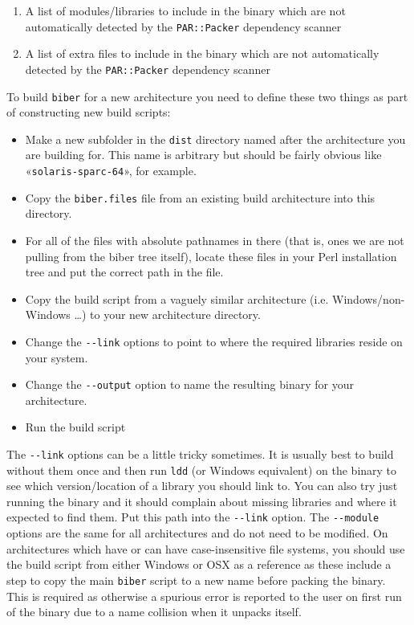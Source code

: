 \documentclass{ltxdockit}
\begin{document}
\begin{enumerate}
\item A list of modules/libraries to include in the binary which are not
  automatically detected by the \verb+PAR::Packer+ dependency
  scanner
\item A list of extra files to include in the binary which are not
  automatically detected by the \verb+PAR::Packer+ dependency
  scanner
\end{enumerate}

\noindent To build \verb+biber+ for a new architecture you need to
define these two things as part of constructing new build scripts:

\begin{itemize}
\item Make a new subfolder in the \verb+dist+ directory named after the
  architecture you are building for. This name is arbitrary but should
  be fairly obvious like «\verb+solaris-sparc-64+», for example.
\item Copy the \verb+biber.files+ file from an existing build
  architecture into this directory.
\item For all of the files with absolute pathnames in there (that is,
  ones we are not pulling from the biber tree itself), locate these
  files in your Perl installation tree and put the correct path in the
  file.
\item Copy the build script from a vaguely similar architecture
  (i.e. Windows/non-Windows \ldots) to your new architecture
  directory. 
\item Change the \verb+--link+ options to point to where the required
  libraries reside on your system.
\item Change the \verb+--output+ option to name the resulting binary
  for your architecture.
\item Run the build script
\end{itemize}

\noindent The \verb+--link+ options can be a little tricky
sometimes. It is usually best to build without them once and then run
\verb+ldd+ (or Windows equivalent) on the binary to see which
version/location of a library you should link to. You can also try
just running the binary and it should complain about missing libraries
and where it expected to find them. Put this path into the
\verb+--link+ option. The \verb+--module+ options are the same for all
architectures and do not need to be modified.
On architectures which have or can have case-insensitive file systems,
you should use the build script from either Windows or OSX as a reference
as these include a step to copy the main \verb+biber+ script to a new name
before packing the binary. This is required as otherwise a spurious
error is reported to the user on first run of the binary due to a name
collision when it unpacks itself.
\end{document}
